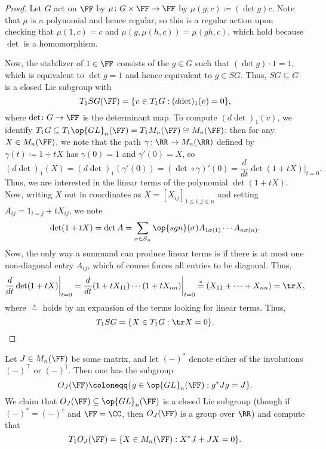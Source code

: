 \documentclass[../notes.tex]{subfiles}
\begin{document}
\begin{proof}
	Let $G$ act on $\FF$ by $\mu\colon G\times\FF\to\FF$ by $\mu(g,c)\coloneqq(\det g)c$. Note that $\mu$ is a polynomial and hence regular, so this is a regular action upon checking that $\mu(1,c)=c$ and $\mu(g,\mu(h,c))=\mu(gh,c)$, which hold because $\det$ is a homomorphism.
	
	Now, the stabilizer of $1\in\FF$ consists of the $g\in G$ such that $(\det g)\cdot1=1$, which is equivalent to $\det g=1$ and hence equivalent to $g\in SG$. Thus, $SG\subseteq G$ is a closed Lie subgroup with
	\[T_1SG(\FF)=\{v\in T_1G:(d{\det})_1(v)=0\},\]
	where $\det\colon G\to\FF$ is the determinant map. To compute $(d{\det})_1(v)$, we identify $T_1G\subseteq T_1\op{GL}_n(\FF)=T_1M_n(\FF)\cong M_n(\FF)$; then for any $X\in M_n(\FF)$, we note that the path $\gamma\colon\RR\to M_n(\RR)$ defined by $\gamma(t)\coloneqq 1+tX$ has $\gamma(0)=1$ and $\gamma'(0)=X$, so
	\[(d{\det})_1(X)=(d{\det})_1(\gamma'(0))=(\det\circ\gamma)'(0)=\frac d{dt}\det(1+tX)\bigg|_{t=0}.\]
	Thus, we are interested in the linear terms of the polynomial $\det(1+tX)$. Now, writing $X$ out in coordinates as $X=[X_{ij}]_{1\le i,j\le n}$ and setting $A_{ij}=1_{i=j}+tX_{ij}$, we note
	\[\det(1+tX)=\det A=\sum_{\sigma\in S_n}\op{sgn}(\sigma)A_{1\sigma(1)}\cdots A_{n\sigma(n)}.\]
	Now, the only way a summand can produce linear terms is if there is at most one non-diagonal entry $A_{ij}$, which of course forces all entries to be diagonal. Thus,
	\[\frac d{dt}\det(1+tX)\bigg|_{t=0}=\frac d{dt}(1+tX_{11})\cdots(1+tX_{nn})\bigg|_{t=0}\stackrel*=(X_{11}+\cdots+X_{nn})=\tr X,\]
	where $\stackrel*=$ holds by an expansion of the terms looking for linear terms. Thus,
	\[T_1SG=\{X\in T_1G:\tr X=0\}.\]
\end{proof}
\begin{lemma} \label{lem:bilinear-tangent-space}
	Let $J\in M_n(\FF)$ be some matrix, and let $(-)^*$ denote either of the involutions $(-)^\intercal$ or $(-)^\dagger$. Then one has the subgroup
	\[O_J(\FF)\coloneqq\{g\in\op{GL}_n(\FF):g^*Jg=J\}.\]
	We claim that $O_J(\FF)\subseteq\op{GL}_n(\FF)$ is a closed Lie subgroup (though if $(-)^*=(-)^\dagger$ and $\FF=\CC$, then $O_J(\FF)$ is a group over $\RR$) and compute that
	\[T_1O_J(\FF)=\{X\in M_n(\FF):X^*J+JX=0\}.\]
\end{lemma}
\end{document}

